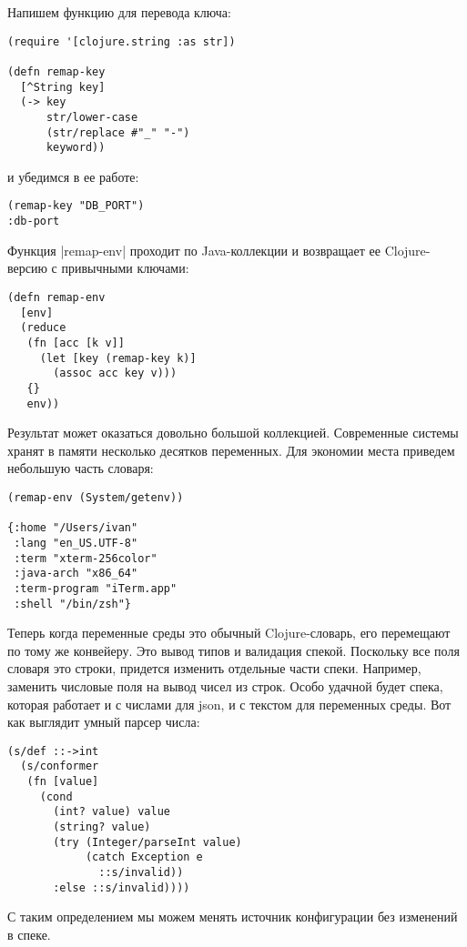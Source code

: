 Напишем функцию для перевода ключа:

\begin{verbatim}
(require '[clojure.string :as str])

(defn remap-key
  [^String key]
  (-> key
      str/lower-case
      (str/replace #"_" "-")
      keyword))
\end{verbatim}

и убедимся в ее работе:

\begin{verbatim}
(remap-key "DB_PORT")
:db-port
\end{verbatim}

Функция \spverb|remap-env| проходит по Java-коллекции и возвращает ее Clojure-версию с
привычными ключами:

\begin{verbatim}
(defn remap-env
  [env]
  (reduce
   (fn [acc [k v]]
     (let [key (remap-key k)]
       (assoc acc key v)))
   {}
   env))
\end{verbatim}

Результат может оказаться довольно большой коллекцией. Современные системы
хранят в памяти несколько десятков переменных. Для экономии места приведем
небольшую часть словаря:

\begin{verbatim}
(remap-env (System/getenv))

{:home "/Users/ivan"
 :lang "en_US.UTF-8"
 :term "xterm-256color"
 :java-arch "x86_64"
 :term-program "iTerm.app"
 :shell "/bin/zsh"}
\end{verbatim}

Теперь когда переменные среды это обычный Clojure-словарь, его перемещают по
тому же конвейеру. Это вывод типов и валидация спекой. Поскольку все поля
словаря это строки, придется изменить отдельные части спеки. Например, заменить
числовые поля на вывод чисел из строк. Особо удачной будет спека, которая
работает и с числами для json, и с текстом для переменных среды. Вот как
выглядит умный парсер числа:

\begin{verbatim}
(s/def ::->int
  (s/conformer
   (fn [value]
     (cond
       (int? value) value
       (string? value)
       (try (Integer/parseInt value)
            (catch Exception e
              ::s/invalid))
       :else ::s/invalid))))
\end{verbatim}

С таким определением мы можем менять источник конфигурации без изменений в
спеке.


